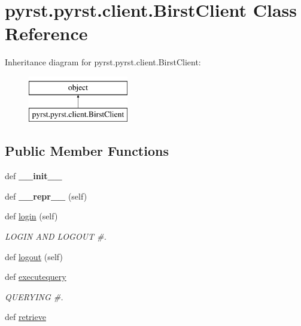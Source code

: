 \hypertarget{classpyrst_1_1pyrst_1_1client_1_1_birst_client}{}\section{pyrst.\+pyrst.\+client.\+Birst\+Client Class Reference}
\label{classpyrst_1_1pyrst_1_1client_1_1_birst_client}
Inheritance diagram for pyrst.\+pyrst.\+client.\+Birst\+Client\+:\begin{figure}[H]
\begin{center}
\leavevmode
\includegraphics[height=2.000000cm]{classpyrst_1_1pyrst_1_1client_1_1_birst_client}
\end{center}
\end{figure}
\subsection*{Public Member Functions}
\begin{DoxyCompactItemize}
\item 
\hypertarget{classpyrst_1_1pyrst_1_1client_1_1_birst_client_a2d349d2e5f467a367a07de6dad164269}{}def {\bfseries \+\_\+\+\_\+init\+\_\+\+\_\+}\label{classpyrst_1_1pyrst_1_1client_1_1_birst_client_a2d349d2e5f467a367a07de6dad164269}

\item 
\hypertarget{classpyrst_1_1pyrst_1_1client_1_1_birst_client_aa367e96d5a65ce5d4afd9a0bd25c2889}{}def {\bfseries \+\_\+\+\_\+repr\+\_\+\+\_\+} (self)\label{classpyrst_1_1pyrst_1_1client_1_1_birst_client_aa367e96d5a65ce5d4afd9a0bd25c2889}

\item 
def \hyperlink{classpyrst_1_1pyrst_1_1client_1_1_birst_client_ab0090c1a32abe9f701063ba814d23656}{login} (self)
\begin{DoxyCompactList}\small\item\em L\+O\+G\+I\+N A\+N\+D L\+O\+G\+O\+U\+T \#. \end{DoxyCompactList}\item 
def \hyperlink{classpyrst_1_1pyrst_1_1client_1_1_birst_client_a92c654912a5a6e0e4590fa1714463956}{logout} (self)
\item 
def \hyperlink{classpyrst_1_1pyrst_1_1client_1_1_birst_client_a5420fea6cda5cee1115a376e1e24115d}{executequery}
\begin{DoxyCompactList}\small\item\em Q\+U\+E\+R\+Y\+I\+N\+G \#. \end{DoxyCompactList}\item 
def \hyperlink{classpyrst_1_1pyrst_1_1client_1_1_birst_client_ae346cadad3a8cf2b479c572a1da846d4}{retrieve}
\end{DoxyCompactItemize}
